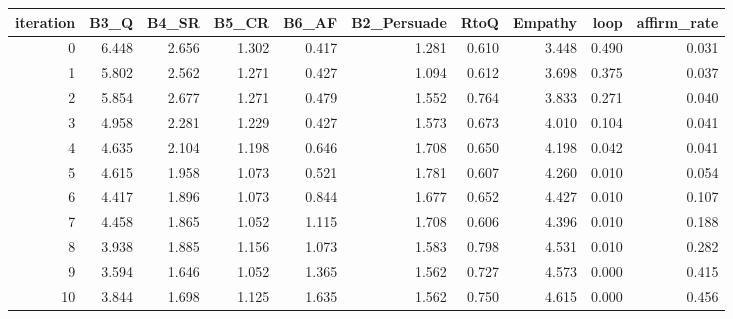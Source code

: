 \begin{tabular}{rrrrrrrrrr}
\toprule
iteration & B3\_Q & B4\_SR & B5\_CR & B6\_AF & B2\_Persuade & RtoQ & Empathy & loop & affirm\_rate \\
\midrule
0 & 6.448 & 2.656 & 1.302 & 0.417 & 1.281 & 0.610 & 3.448 & 0.490 & 0.031 \\
1 & 5.802 & 2.562 & 1.271 & 0.427 & 1.094 & 0.612 & 3.698 & 0.375 & 0.037 \\
2 & 5.854 & 2.677 & 1.271 & 0.479 & 1.552 & 0.764 & 3.833 & 0.271 & 0.040 \\
3 & 4.958 & 2.281 & 1.229 & 0.427 & 1.573 & 0.673 & 4.010 & 0.104 & 0.041 \\
4 & 4.635 & 2.104 & 1.198 & 0.646 & 1.708 & 0.650 & 4.198 & 0.042 & 0.041 \\
5 & 4.615 & 1.958 & 1.073 & 0.521 & 1.781 & 0.607 & 4.260 & 0.010 & 0.054 \\
6 & 4.417 & 1.896 & 1.073 & 0.844 & 1.677 & 0.652 & 4.427 & 0.010 & 0.107 \\
7 & 4.458 & 1.865 & 1.052 & 1.115 & 1.708 & 0.606 & 4.396 & 0.010 & 0.188 \\
8 & 3.938 & 1.885 & 1.156 & 1.073 & 1.583 & 0.798 & 4.531 & 0.010 & 0.282 \\
9 & 3.594 & 1.646 & 1.052 & 1.365 & 1.562 & 0.727 & 4.573 & 0.000 & 0.415 \\
10 & 3.844 & 1.698 & 1.125 & 1.635 & 1.562 & 0.750 & 4.615 & 0.000 & 0.456 \\
\bottomrule
\end{tabular}
